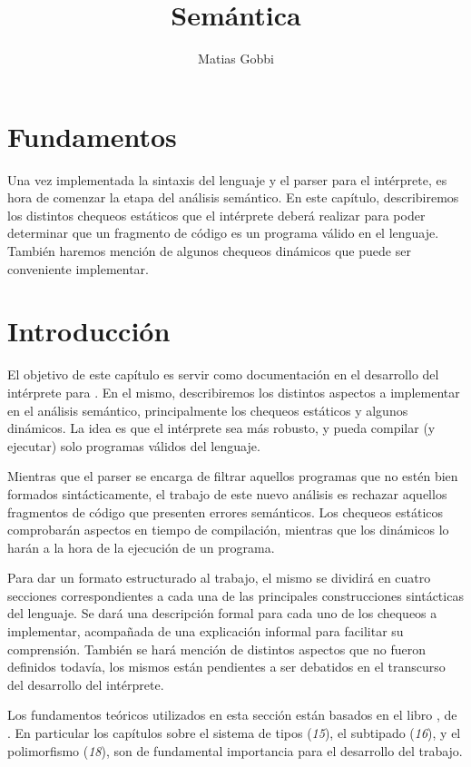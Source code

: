 \documentclass{article}
\begin{document}
\title{Semántica}
\author{Matias Gobbi}
\maketitle

\section*{Fundamentos}

Una vez implementada la sintaxis del lenguaje y el parser para el intérprete, es hora de comenzar la etapa del análisis semántico.
En este capítulo, describiremos los distintos chequeos estáticos que el intérprete deberá realizar para poder determinar que un fragmento de código es un programa válido en el lenguaje.
También haremos mención de algunos chequeos dinámicos que puede ser conveniente implementar.

\section{Introducción}

El objetivo de este capítulo es servir como documentación en el desarrollo del intérprete para \Lang.
En el mismo, describiremos los distintos aspectos a implementar en el análisis semántico, principalmente los chequeos estáticos y algunos dinámicos.
La idea es que el intérprete sea más robusto, y pueda compilar (y ejecutar) solo programas válidos del lenguaje.

Mientras que el parser se encarga de filtrar aquellos programas que no estén bien formados sintácticamente, el trabajo de este nuevo análisis es rechazar aquellos fragmentos de código que presenten errores semánticos.
Los chequeos estáticos comprobarán aspectos en tiempo de compilación, mientras que los dinámicos lo harán a la hora de la ejecución de un programa.

Para dar un formato estructurado al trabajo, el mismo se dividirá en cuatro secciones correspondientes a cada una de las principales construcciones sintácticas del lenguaje.
Se dará una descripción formal para cada uno de los chequeos a implementar, acompañada de una explicación informal para facilitar su comprensión.
También se hará mención de distintos aspectos que no fueron definidos todavía, los mismos están pendientes a ser debatidos en el transcurso del desarrollo del intérprete.

Los fundamentos teóricos utilizados en esta sección están basados en el libro \Lib, de \Aut.
En particular los capítulos sobre el sistema de tipos (\textit{15}), el subtipado (\textit{16}), y el polimorfismo (\textit{18}), son de fundamental importancia para el desarrollo del trabajo.
\end{document}
